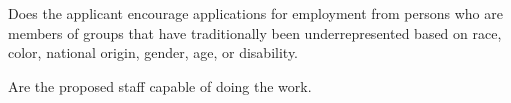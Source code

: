Does the applicant encourage applications for employment from persons who are members of groups that have traditionally been underrepresented based on race, color, national origin, gender, age, or disability.

Are the proposed staff capable of doing the work.
